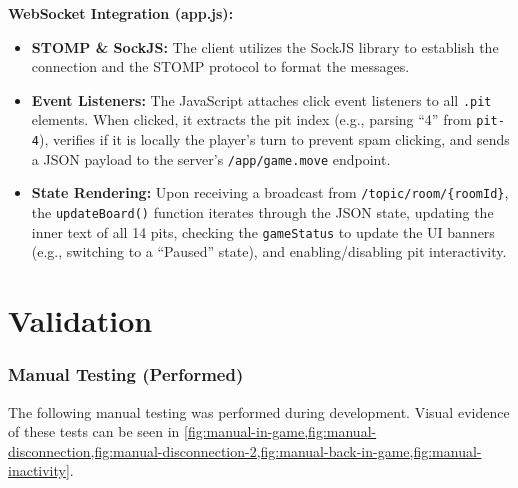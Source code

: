\documentclass{scrartcl}
\begin{document}
\textbf{WebSocket Integration (app.js):}
\begin{itemize}
  \item \textbf{STOMP \& SockJS:} The client utilizes the SockJS library to establish the connection and the STOMP protocol to format the messages.
  \item \textbf{Event Listeners:} The JavaScript attaches click event listeners to all \texttt{.pit} elements. When clicked, it extracts the pit index (e.g., parsing ``4'' from \texttt{pit-4}), verifies if it is locally the player's turn to prevent spam clicking, and sends a JSON payload to the server's \texttt{/app/game.move} endpoint.
  \item \textbf{State Rendering:} Upon receiving a broadcast from \texttt{/topic/room/\{roomId\}}, the \texttt{updateBoard()} function iterates through the JSON state, updating the inner text of all 14 pits, checking the \texttt{gameStatus} to update the UI banners (e.g., switching to a ``Paused'' state), and enabling/disabling pit interactivity.
\end{itemize}


\section{Validation}\label{validation}

\subsubsection{Manual Testing (Performed)}

The following manual testing was performed during development. Visual evidence of these tests can be seen in \cref{fig:manual-in-game,fig:manual-disconnection,fig:manual-disconnection-2,fig:manual-back-in-game,fig:manual-inactivity}.
\end{document}
